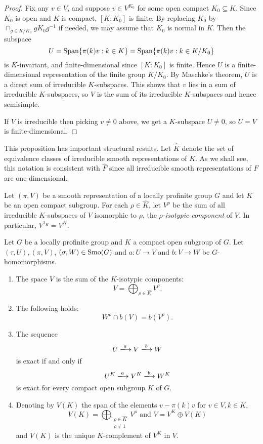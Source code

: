 \begin{proof}
	Fix any $v\in V$, and suppose $v\in V^{K_0}$ for some open compact $K_0\subseteq K$. Since $K_0$ is open and $K$ is compact, $[K:K_0]$ is finite. By replacing $K_0$ by $\cap_{g\in K/K_0}gK_0g^{-1}$ if needed, we may assume that $K_0$ is normal in $K$. Then the subspace
	$$U=\mathrm{Span}\{\pi(k)v:k\in K\}=\mathrm{Span}\{\pi(k)v:k\in K/K_0\}$$
	is $K$-invariant, and finite-dimensional since $[K:K_0]$ is finite. Hence $U$ is a finite-dimensional representation of the finite group $K/K_0$. By Maschke's theorem, $U$ is a direct sum of irreducible $K$-subspaces. This shows that $v$ lies in a sum of irreducible $K$-subspaces, so $V$ is the sum of its irreducible $K$-subspaces and hence semisimple. 
	
	If $V$ is irreducible then picking $v\not=0$ above, we get a $K$-subspace $U\not=0$, so $U=V$ is finite-dimensional.
\end{proof}

This proposition has important structural results. Let $\hat{K}$ denote the set of equivalence classes of irreducible smooth representations of $K$. As we shall see, this notation is consistent with $\hat{F}$ since all irreducible smooth representations of $F$ are one-dimensional.

Let $(\pi,V)$ be a smooth representation of a locally profinite group $G$ and let $K$ be an open compact subgroup. For each $\rho\in\hat{K}$, let $V^\rho$ be the sum of all irreducible $K$-subspaces of $V$ isomorphic to $\rho$, the \textit{$\rho$-isotypic component} of $V$. In particular, $V^{1_K}=V^K$.

\begin{prop}
    Let $G$ be a locally profinite group and $K$ a compact open subgroup of $G$. Let $(\tau,U),(\pi,V)$, $(\sigma,W)\in\mathrm{Smo}(G)$ and $a:U\rightarrow V$ and $b:V\rightarrow W$ be $G$-homomorphisms. 
    \begin{enumerate}
        \item The space $V$ is the sum of the $K$-isotypic components:
        $$V=\bigoplus_{\rho\in\hat{K}}V^\rho.$$
        \item The following holds:
        $$W^\rho\cap b(V)=b(V^\rho).$$
        \item The sequence
        $$U\xlongrightarrow{a} V\xlongrightarrow{b} W$$
        is exact if and only if 
        $$U^K\xlongrightarrow{a} V^K \xlongrightarrow{b} W^K$$
        is exact for every compact open subgroup $K$ of $G$.
        \item Denoting by $V(K)$ the span of the elements $v-\pi(k)v$ for $v\in V, k\in K$,
        $$V(K)=\bigoplus_{\substack{\rho\in\hat{K}\\\rho\neq 1}}V^\rho \text{ and } V=V^K\oplus V(K)$$
        and $V(K)$ is the unique $K$-complement of $V^K$ in $V$. 
    \end{enumerate}
\end{prop}

